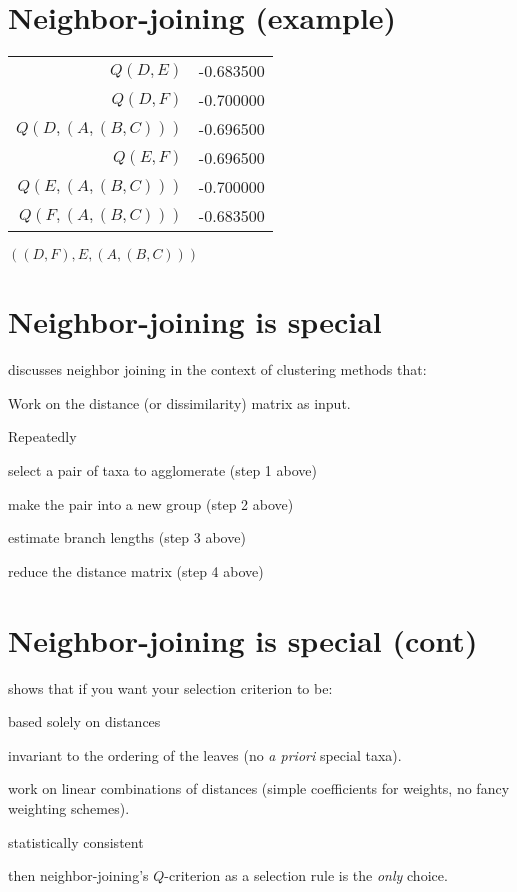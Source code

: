 \documentclass[landscape]{foils}
\begin{document}
\myNewSlide
\section*{Neighbor-joining (example)}
\begin{table}[htdp]
\begin{center}
\begin{tabular}{|r|c|}
\hline
$Q(D,E)$ & -0.683500 \\
{\color{red}$Q(D,F)$} & {\color{red}-0.700000} \\
$Q(D,(A,(B,C)))$ & -0.696500 \\
$Q(E,F)$ & -0.696500 \\
$Q(E,(A,(B,C)))$ & -0.700000 \\
$Q(F,(A,(B,C)))$ & -0.683500 \\
\hline
\end{tabular}
\end{center}
\end{table}%
\begin{center}
{\color{red}$((D,F),E,(A,(B,C)))$}
\end{center}


\myNewSlide
\section*{Neighbor-joining is special}
\citet{Bryant2005} discusses neighbor joining in the context of clustering methods that:
\begin{compactitem}
	\item Work on the distance (or dissimilarity) matrix as input.
	\item Repeatedly
	\begin{compactitem}
		\item select a pair of taxa to agglomerate (step 1 above)
		\item make the pair into a new group (step 2 above)
		\item estimate branch lengths (step 3 above)
		\item reduce the distance matrix (step 4 above)
	\end{compactitem}
\end{compactitem}

\myNewSlide
\section*{Neighbor-joining is special (cont)}
\citet{Bryant2005} shows that if you want your selection criterion to be:
\begin{compactitem}
	\item based solely on distances
	\item invariant to the ordering of the leaves (no {\em a priori} special taxa).
	\item work on linear combinations of distances (simple coefficients for weights, no fancy weighting schemes).
	\item statistically consistent
\end{compactitem}
then neighbor-joining's $Q$-criterion as a selection rule is the {\em only} choice.
	
\end{document}
